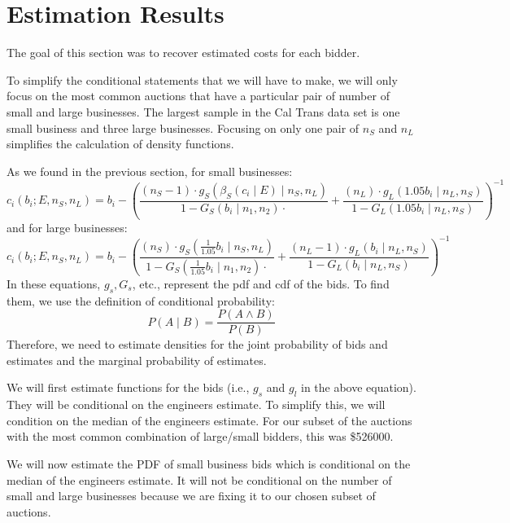 \section{Estimation Results}

The goal of this section was to recover estimated costs for each bidder.

To simplify the conditional statements that we will have to make, we will only
focus on the most common auctions that have a particular pair of number of small
and large businesses. The largest sample in the Cal Trans data set is one small business
and three large businesses. %
Focusing on only one pair of \(n_S\) and \(n_L\) simplifies the calculation
of density functions.

As we found in the previous section, for small businesses:
\[
  c_i(b_i; E, n_S, n_L) = b_i - \left(\frac{(n_S - 1) \cdot g_S(\beta_S(c_i \mid E) \mid n_S, n_L)}{1 - G_S(b_i \mid n_1, n_2) \cdot} +
    \frac{(n_L) \cdot g_L(1.05 b_i \mid n_L, n_S)}{1 - G_L(1.05 b_i \mid n_L, n_S)} \right)^{-1}
\]
and for large businesses:
\[ 
  c_i(b_i; E, n_S, n_L) = b_i - \left(\frac{(n_S) \cdot g_S(\frac{1}{1.05} b_i \mid n_S, n_L)}{1 - G_S(\frac{1}{1.05} b_i \mid n_1, n_2) \cdot} +
    \frac{(n_L - 1) \cdot g_L(b_i \mid n_L, n_S)}{1 - G_L(b_i \mid n_L, n_S)} \right)^{-1}
\]
In these equations, \(g_s, G_s\), etc., represent the pdf and cdf of the bids.
To find them, we use the definition of conditional probability:
\[
P(A \mid B) = \frac{P(A \land B)}{P(B)}
\]
Therefore, we need to estimate densities for the joint probability of bids and
estimates and the marginal probability of estimates.

We will first estimate functions for the bids (i.e., \(g_s\) and \(g_l\)
in the above equation). They will be conditional on the engineers estimate.
To simplify this, we will condition on the median of the engineers estimate.
For our subset of the auctions with the most common combination of large/small bidders,
this was \$526000.

We will now estimate the PDF of small business bids which is conditional on the
median of the engineers estimate.
It will not be conditional on the number of small and large businesses because
we are fixing it to our chosen subset of auctions.

